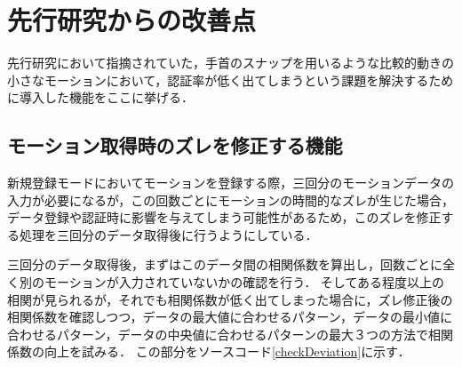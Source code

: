 \documentclass[11pt]{jreport}
\begin{document}
    \section{先行研究からの改善点}
    先行研究において指摘されていた，手首のスナップを用いるような比較的動きの小さなモーションにおいて，認証率が低く出てしまうという課題を解決するために導入した機能をここに挙げる．

        \subsection{モーション取得時のズレを修正する機能}
        新規登録モードにおいてモーションを登録する際，三回分のモーションデータの入力が必要になるが，この回数ごとにモーションの時間的なズレが生じた場合，データ登録や認証時に影響を与えてしまう可能性があるため，このズレを修正する処理を三回分のデータ取得後に行うようにしている．

        三回分のデータ取得後，まずはこのデータ間の相関係数を算出し，回数ごとに全く別のモーションが入力されていないかの確認を行う．
        そしてある程度以上の相関が見られるが，それでも相関係数が低く出てしまった場合に，ズレ修正後の相関係数を確認しつつ，データの最大値に合わせるパターン，データの最小値に合わせるパターン，データの中央値に合わせるパターンの最大３つの方法で相関係数の向上を試みる．
        この部分をソースコード\ref{checkDeviation}に示す．
\end{document}
